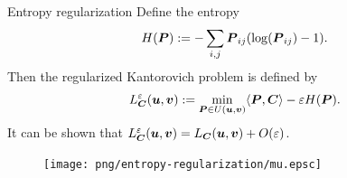 \begin{frame}{Entropy regularization}
    \footnotesize
    Define the entropy
    \begin{equation}
        H(\boldsymbol P) := -\sum_{i,j} \boldsymbol{P}_{ij}(\log(\boldsymbol{P}_{ij})-1).
    \end{equation}
    Then the regularized Kantorovich problem is defined by
    \begin{equation}
        L_{\boldsymbol C}^\varepsilon (\boldsymbol u,\boldsymbol v)
        := \min_{\boldsymbol P\in U(\boldsymbol u, \boldsymbol v)} 
        \langle \boldsymbol P, \boldsymbol C \rangle - \varepsilon H(\boldsymbol P).
    \end{equation}
    It can be shown that
    $L_{\boldsymbol C}^\varepsilon (\boldsymbol u,\boldsymbol v)
        = L_{\boldsymbol C} (\boldsymbol u,\boldsymbol v) + O(\varepsilon)$.

    \begin{figure}
        \captionsetup{font=scriptsize}
        \begin{minipage}[t]{0.05\linewidth}
            \vspace{0pt}
            \hfill
        \end{minipage}
        \hfill
        \begin{minipage}[t]{0.18\linewidth}
            \vspace{0pt}
            \centering
            \texttt{[image: png/entropy-regularization/mu.epsc]}
        \end{minipage}
        \hfill
        \begin{minipage}[t]{0.18\linewidth}
            \vspace{0pt}
            \hfill
        \end{minipage}
        \hfill
        \begin{minipage}[t]{0.18\linewidth}
            \vspace{0pt}
            \hfill
        \end{minipage}
        \hfill
        \begin{minipage}[t]{0.18\linewidth}
            \vspace{0pt}
            \hfill
        \end{minipage}
        \hfill
        \begin{minipage}[t]{0.18\linewidth}
            \vspace{0pt}
            \hfill
        \end{minipage}
        \hfill
    \end{figure}
    

\end{frame}
